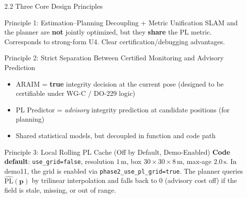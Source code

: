 \documentclass[10pt,aspectratio=169,xcolor=dvipsnames]{beamer}
\newcommand{\PL}{\mathrm{PL}}
\newcommand{\1}{\mathbb{1}}
\newcommand{\innov}[1]{\textcolor{NavyBlue}{\textbf{#1}}}
\begin{document}
\begin{frame}{2.2 Three Core Design Principles}
  \begin{block}{Principle 1: Estimation--Planning Decoupling + Metric Unification}
    \small SLAM and the planner are \textbf{not} jointly optimized, but they \textbf{share} the PL metric.
    Corresponds to strong-form U4. Clear certification/debugging advantages.
  \end{block}

  \begin{block}{Principle 2: Strict Separation Between Certified Monitoring and Advisory Prediction}
    \small
    \begin{itemize}\tiny
      \item ARAIM = \textbf{true} integrity decision at the current pose (designed to be certifiable under WG-C / DO-229 logic)
      \item PL Predictor = \emph{advisory} integrity prediction at candidate positions (for planning)
      \item Shared statistical models, but decoupled in function and code path
    \end{itemize}
  \end{block}

  \begin{block}{Principle 3: Local Rolling PL Cache (Off by Default, Demo-Enabled)}
    \small \innov{Code default}: \texttt{use\_grid=false}, resolution \(1\,\si{\meter}\),
    box \(30\times 30\times 8\,\si{\meter}\), max-age \(2.0\,\si{\second}\).
    In demo11, the grid is enabled via \texttt{phase2\_use\_pl\_grid=true}.
    The planner queries \(\widehat{\PL}(\bm{p})\) by trilinear interpolation and falls back to 0 (advisory cost off) if the field is stale, missing, or out of range.
  \end{block}
\end{frame}
\end{document}
